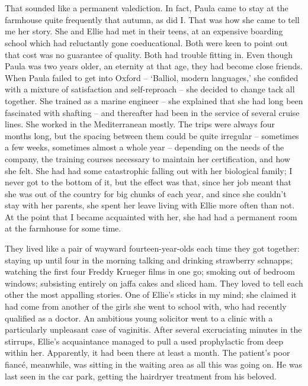 \section{}

That sounded like a permanent valediction. In fact, Paula came to stay at the farmhouse quite frequently that autumn, as did I. That was how she came to tell me her story. She and Ellie had met in their teens, at an expensive boarding school which had reluctantly gone coeducational. Both were keen to point out that cost was no guarantee of quality. Both had trouble fitting in. Even though Paula was two years older, an eternity at that age, they had become close friends. When Paula failed to get into Oxford -- `Balliol, modern languages,' she confided with a mixture of satisfaction and self-reproach -- she decided to change tack all together. She trained as a marine engineer -- she explained that she had long been fascinated with shafting -- and thereafter had been in the service of several cruise lines. She worked in the Mediterranean mostly. The trips were always four months long, but the spacing between them could be quite irregular -- sometimes a few weeks, sometimes almost a whole year -- depending on the needs of the company, the training courses necessary to maintain her certification, and how she felt. She had had some catastrophic falling out with her biological family; I never got to the bottom of it, but the effect was that, since her job meant that she was out of the country for big chunks of each year, and since she couldn't stay with her parents, she spent her leave living with Ellie more often than not. At the point that I became acquainted with her, she had had a permanent room at the farmhouse for some time.

They lived like a pair of wayward fourteen-year-olds each time they got together: staying up until four in the morning talking and drinking strawberry schnapps; watching the first four Freddy Krueger films in one go; smoking out of bedroom windows; subsisting entirely on jaffa cakes and sliced ham. They loved to tell each other the most appalling stories. One of Ellie's sticks in my mind; she claimed it had come from another of the girls she went to school with, who had recently qualified as a doctor. An ambitious young solicitor went to a clinic with a particularly unpleasant case of vaginitis. After several excruciating minutes in the stirrups, Ellie's acquaintance managed to pull a used prophylactic from deep within her. Apparently, it had been there at least a month. The patient's poor fianc\'e, meanwhile, was sitting in the waiting area as all this was going on. He was last seen in the car park, getting the hairdryer treatment from his beloved.

